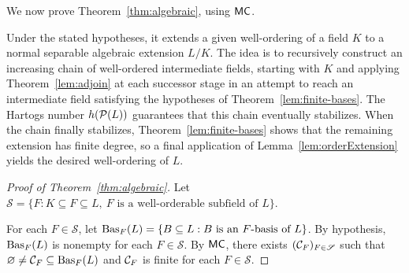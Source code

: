 We now prove Theorem~\ref{thm:algebraic}, using $\mathsf{MC}$.

Under the stated hypotheses, it extends a given well-ordering of a field $K$ to a normal separable algebraic extension $L/K$.
The idea is to recursively construct an increasing chain of well-ordered intermediate fields, starting with $K$ and applying Theorem~\ref{lem:adjoin} at each successor stage in an attempt to reach an intermediate field satisfying the hypotheses of Theorem~\ref{lem:finite-bases}.
The Hartogs number $h(\mathcal P(L))$ guarantees that this chain eventually stabilizes.
When the chain finally stabilizes, Theorem~\ref{lem:finite-bases} shows that the remaining extension has finite degree, so a final application of Lemma~\ref{lem:orderExtension} yields the desired well-ordering of \(L\).

\begin{proof}[Proof of Theorem~\ref{thm:algebraic}]
Let $\mathscr S=\{F:K\subseteq F\subseteq L,
                 \ F\text{ is a well-orderable subfield of }L\}$.

For each $F\in\mathscr S$, let $\operatorname{Bas}_F(L)=\{B\subseteq L:B\text{ is an }F\text{-basis of }L\}$.
By hypothesis, $\operatorname{Bas}_F(L)$ is nonempty for each $F\in\mathscr S$.
By $\mathsf{MC}$, there exists $(\mathcal C_F)_{F\in\mathscr S}$ such that $\varnothing\ne\mathcal C_F\subseteq\operatorname{Bas}_F(L)$ and $\mathcal C_F$ is finite for each $F\in\mathscr S$.



\end{proof}
